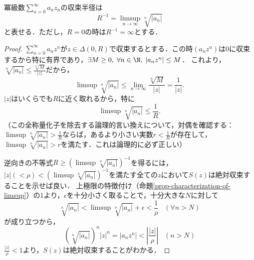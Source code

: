 \documentclass[uplatex, dvipdfmx]{jsreport}
\begin{document}
\begin{theorem}\label{thm-Hadamard}
    冪級数$\sum^\infty_{n=0}a_nz_n$の収束半径は
    \[ R^{-1}=\limsup_{n\to\infty}\sqrt[n]{|a_n|} \]
    と表せる．ただし，$R=0$の時は$R^{-1}=\infty$とする．
\end{theorem}
\begin{proof}
    $\sum^\infty_{n=0}a_nz^n$が$z\in\Delta(0,R)$で収束するとする．この時$(a_nz^n)$は$0$に収束するから特に有界であり，$\exists M\ge 0,\; \forall n\in\N,\; |a_nz^n|\le M$．
    これより，$\sqrt[n]{|a_n|}\le\frac{\sqrt[n]{M}}{|z|}$だから，
    \[ \limsup\sqrt[n]{|a_n|}\le\lim_{n\to\infty}\frac{\sqrt[n]{M}}{|z|}=\frac{1}{|z|}. \]
    $|z|$はいくらでも$R$に近く取れるから，特に
    \[ \limsup\sqrt[n]{|a_n|}\le\frac{1}{R}. \]
    （この全称量化子を除去する論理的言い換えについて，対偶を確認する：$\limsup\sqrt[n]{|a_n|}>\frac{1}{R}$ならば，あるより小さい実数$r<\frac{1}{R}$が存在して，$\limsup\sqrt[n]{|a_n|}>r$を満たす．これは論理的に必ず正しい）

    逆向きの不等式$R\ge(\limsup\sqrt[n]{|a_n|})^{-1}$を得るには，$|z|(<\rho)<(\limsup\sqrt[n]{|a_n|})^{-1}$を満たす全ての$z$において$S(z)$は絶対収束することを示せば良い．
    上極限の特徴付け（命題\ref{prop-characterization-of-limsup}）の1より，$\epsilon$を十分小さく取ることで，十分大きな$N$に対して
    \[ \sqrt[n]{|a_n|}<\limsup\sqrt[n]{|a_n|}+\epsilon<\frac{1}{\rho}\;\;\;(\forall n>N) \]
    が成り立つから，
    \[ (\sqrt[n]{|a_n|})^n|z|^n=|a_nz^n|<\left|\frac{|z|}{\rho}\right|\;\;\;(n>N) \]
    $\frac{|z|}{\rho}<1$より，$S(z)$は絶対収束することがわかる．
\end{proof}
\end{document}
